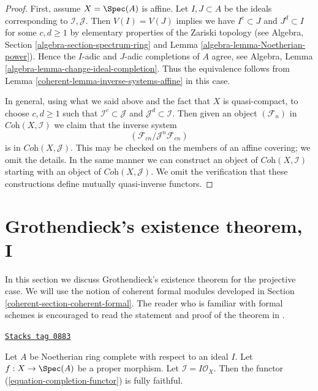 \begin{proof}

First, assume $X = \Spec(A)$ is affine. Let $I, J \subset A$ be the ideals
corresponding to $\mathcal{I}, \mathcal{J}$. Then $V(I) = V(J)$
implies we have $I^c \subset J$ and $J^d \subset I$ for some $c, d \geq 1$
by elementary properties of the Zariski topology
(see Algebra, Section \ref{algebra-section-spectrum-ring} and
Lemma \ref{algebra-lemma-Noetherian-power}).
Hence the $I$-adic and $J$-adic completions of $A$ agree, see
Algebra, Lemma \ref{algebra-lemma-change-ideal-completion}.
Thus the equivalence follows from Lemma \ref{coherent-lemma-inverse-systems-affine}
in this case.

\medskip\noindent
In general, using what we said above and the fact that
$X$ is quasi-compact, to choose $c, d \geq 1$ such that
$\mathcal{I}^c \subset \mathcal{J}$ and $\mathcal{J}^d \subset \mathcal{I}$.
Then given an object $(\mathcal{F}_n)$ in
$\textit{Coh}(X, \mathcal{I})$ we claim that the
inverse system
$$
(\mathcal{F}_{cn}/\mathcal{J}^n\mathcal{F}_{cn})
$$
is in $\textit{Coh}(X, \mathcal{J})$. This may be checked on
the members of an affine covering; we omit the details.
In the same manner we can construct an object of
$\textit{Coh}(X, \mathcal{I})$ starting with an object of
$\textit{Coh}(X, \mathcal{J})$. We omit the verification
that these constructions define mutually quasi-inverse functors.
\end{proof}

\section{Grothendieck's existence theorem, I}
\label{coherent-section-existence}
In this section we discuss Grothendieck's existence theorem for the
projective case. We will use the notion of coherent formal modules
developed in Section \ref{coherent-section-coherent-formal}. The reader who is familiar
with formal schemes is encouraged to read the statement and proof
of the theorem in \cite{EGA}.

\begin{lemma}
\label{coherent-lemma-fully-faithful}
\href{https://stacks.math.columbia.edu/tag/0883}{\texttt{Stacks tag 0883}}

Let $A$ be Noetherian ring complete with respect to an ideal $I$.
Let $f : X \to \Spec(A)$ be a proper morphism. Let
$\mathcal{I} = I\mathcal{O}_X$.
Then the functor (\ref{equation-completion-functor}) is fully faithful.
\end{lemma}

